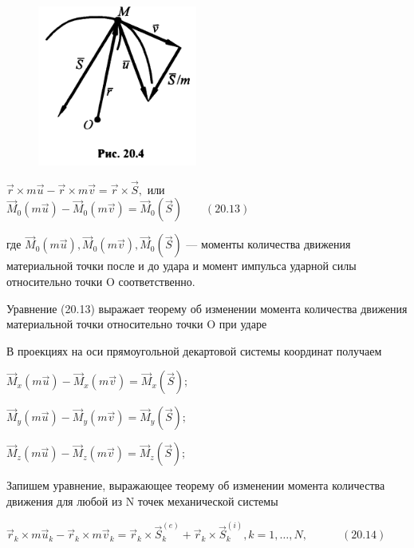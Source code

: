 {\begin{center}
\begin{figure}[H]
    \centering\includegraphics[scale=0.5]{img/20.4.jpeg} 
\end{figure}

\par $\vec{r} \times m \vec{u} - \vec{r} \times m \vec{v} = \vec{r} \times \vec{S},$ или $\vec{M}_0(m \vec{u}) - \vec{M}_0(m \vec{v}) = \vec{M}_0 (\vec{S}) \quad\quad (20.13)$

\par где $\vec{M}_0(m \vec{u}), \vec{M}_0(m \vec{v}), \vec{M}_0(\vec{S})$  —  моменты  количества  движения  материальной точки после и до удара и момент импульса ударной силы относительно точки O соответственно.

\par Уравнение (20.13) выражает теорему об изменении момента количества движения материальной точки относительно точки O при ударе

\par В проекциях на оси прямоугольной декартовой системы координат получаем

\par $\vec{M}_x(m \vec{u}) - \vec{M}_x(m \vec{v}) = \vec{M}_x (\vec{S}) ;$

\par $\vec{M}_y(m \vec{u}) - \vec{M}_y(m \vec{v}) = \vec{M}_y (\vec{S}) ;$

\par $\vec{M}_z(m \vec{u}) - \vec{M}_z(m \vec{v}) = \vec{M}_z (\vec{S}) ;$

\par Запишем  уравнение,  выражающее  теорему  об изменении момента количества  движения для любой из N точек механической системы

\par $\vec{r}_k \times m \vec{u}_k - \vec{r}_k \times m \vec{v}_k = \vec{r}_k \times \vec{S}_k^{(e)} + \vec{r}_k \times \vec{S}_k^{(i)}, k=1, \dots, N, \quad\quad\quad (20.14) $


\end{center}}

